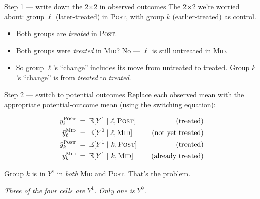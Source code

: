 \documentclass[aspectratio=169,11pt]{beamer}
\begin{document}
\begin{frame}{Step 1 --- write down the 2$\times$2 in observed outcomes}
\vspace{0.4em}
The 2$\times$2 we're worried about: group $\ell$ (later-treated) in \textsc{Post}, with group $k$ (earlier-treated) as control.

\vspace{0.6em}
\begin{center}
\end{center}

\vspace{0.7em}
\begin{itemize}\small
  \item Both groups are \textit{treated} in \textsc{Post}.
  \item Both groups were \textit{treated} in \textsc{Mid}? \;No --- $\ell$ is still untreated in \textsc{Mid}.
  \item So group $\ell$'s ``change'' includes its move from untreated to treated. Group $k$'s ``change'' is from \textit{treated} to \textit{treated}.
\end{itemize}
\end{frame}

\begin{frame}{Step 2 --- switch to potential outcomes}
\vspace{0.4em}
Replace each observed mean with the appropriate potential-outcome mean (using the switching equation):

\vspace{0.4em}
\begin{align*}
\bar y_\ell^{\textsc{Post}} &\;=\; \mathbb{E}[Y^1 \mid \ell, \textsc{Post}] \quad &\text{(treated)} \\
\bar y_\ell^{\textsc{Mid}}  &\;=\; \mathbb{E}[Y^0 \mid \ell, \textsc{Mid}]   \quad &\text{(not yet treated)} \\
\bar y_k^{\textsc{Post}}    &\;=\; \mathbb{E}[Y^1 \mid k, \textsc{Post}]    \quad &\text{(treated)} \\
\bar y_k^{\textsc{Mid}}     &\;=\; \mathbb{E}[Y^1 \mid k, \textsc{Mid}]     \quad &\text{(already treated)}
\end{align*}

\vspace{0.3em}
 \;Group $k$ is in $Y^1$ in \textit{both} \textsc{Mid} and \textsc{Post}. \;That's the problem.

\vspace{0.5em}
\begin{center}
\small\color{warmgray}\itshape
Three of the four cells are $Y^1$. Only one is $Y^0$.
\end{center}
\end{frame}
\end{document}

